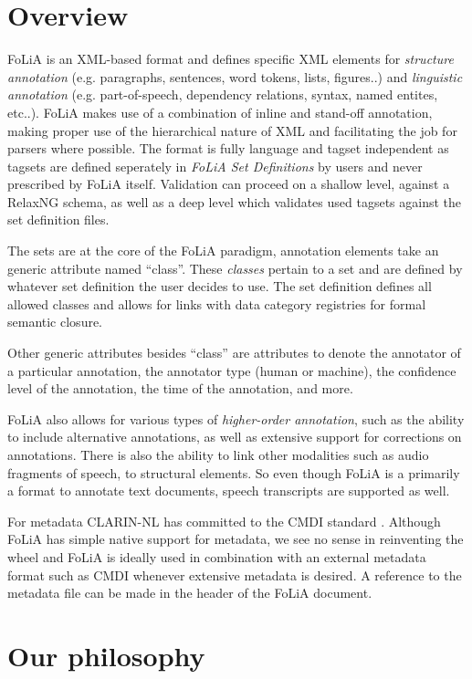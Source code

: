 \documentclass[a4paper,11pt]{article}
\begin{document}
\section{Overview}
\label{sec:overview}

FoLiA is an XML-based format and defines specific XML elements for \emph{structure
annotation} (e.g. paragraphs, sentences, word tokens, lists, figures..) and
\emph{linguistic annotation} (e.g. part-of-speech, dependency relations,
syntax, named entites, etc..). FoLiA makes use of a combination of inline and
stand-off annotation, making proper use of the hierarchical nature of XML and
facilitating the job for parsers where possible. The format is fully language and
tagset independent as tagsets are defined seperately in \emph{FoLiA Set Definitions}
by users and never prescribed by FoLiA itself. Validation can proceed
on a shallow level, against a RelaxNG schema, as well as a deep level which
validates used tagsets against the set definition files.

The sets are at the core of the FoLiA paradigm, annotation elements take an
generic attribute named ``class''. These \emph{classes} pertain to a set and are
defined by whatever set definition the user decides to use. The set definition
defines all allowed classes and allows for links with data category registries
for formal semantic closure.

Other generic attributes besides ``class'' are attributes to denote the
annotator of a particular annotation, the annotator type (human or machine),
the confidence level of the annotation, the time of the annotation, and more.

FoLiA also allows for various types of \emph{higher-order annotation}, such as
the ability to include alternative annotations, as well as extensive support
for corrections on annotations. There is also the ability to link other
modalities such as audio fragments of speech, to structural elements. So even
though FoLiA is a primarily a format to annotate text documents, speech
transcripts are supported as well. 

For metadata CLARIN-NL has committed to the CMDI standard \cite{CMDI}.
Although FoLiA has simple native support for metadata, we see no
sense in reinventing the wheel and FoLiA is ideally used in combination with an
external metadata format such as CMDI whenever extensive metadata is desired. A
reference to the metadata file can be made in the header of the FoLiA document.

\section{Our philosophy}
\label{sec:philosophy}
\end{document}
